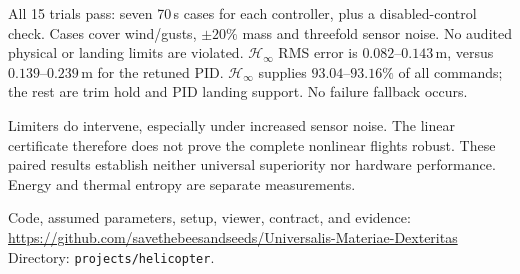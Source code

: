 All 15 trials pass: seven 70\,s cases for each controller, plus a disabled-control
check. Cases cover wind/gusts, $\pm20\%$ mass and threefold sensor noise.
No audited physical or landing limits are violated. $\mathcal H_\infty$ RMS error is
$0.082$--$0.143$\,m, versus $0.139$--$0.239$\,m for the retuned PID.
$\mathcal H_\infty$ supplies $93.04$--$93.16\%$ of all commands; the rest are trim hold and
PID landing support. No failure fallback occurs.

Limiters do intervene, especially under increased sensor noise. The linear
certificate therefore does not prove the complete nonlinear flights robust.
These paired results establish neither universal superiority nor hardware
performance. Energy and thermal entropy are separate measurements.\par
\begingroup\raggedright
Code, assumed parameters, setup, viewer, contract, and evidence:\\
\url{https://github.com/savethebeesandseeds/Universalis-Materiae-Dexteritas}\\
Directory: \texttt{projects/helicopter}.\par
\endgroup
\begingroup\raggedright


\endgroup


